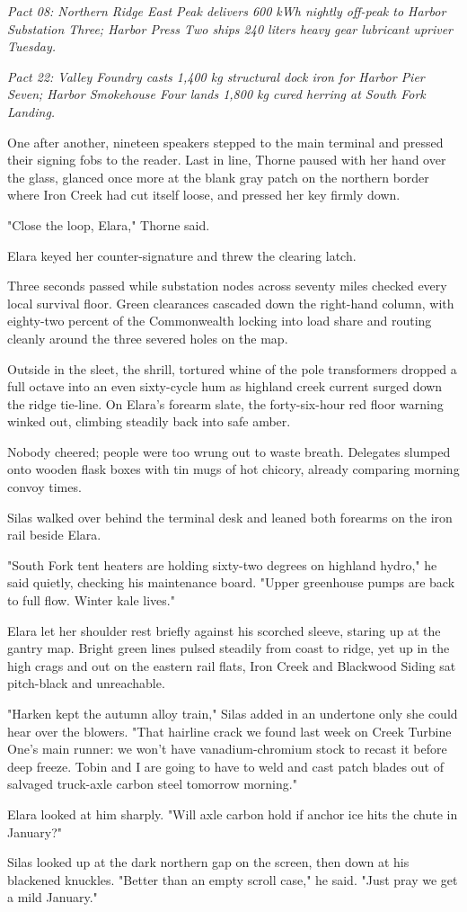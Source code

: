 \textit{Pact 08: Northern Ridge East Peak delivers 600 kWh nightly off-peak to Harbor Substation Three; Harbor Press Two ships 240 liters heavy gear lubricant upriver Tuesday.}

\textit{Pact 22: Valley Foundry casts 1,400 kg structural dock iron for Harbor Pier Seven; Harbor Smokehouse Four lands 1,800 kg cured herring at South Fork Landing.}

One after another, nineteen speakers stepped to the main terminal and pressed their signing fobs to the reader. Last in line, Thorne paused with her hand over the glass, glanced once more at the blank gray patch on the northern border where Iron Creek had cut itself loose, and pressed her key firmly down.

"Close the loop, Elara," Thorne said.

Elara keyed her counter-signature and threw the clearing latch.

Three seconds passed while substation nodes across seventy miles checked every local survival floor. Green clearances cascaded down the right-hand column, with eighty-two percent of the Commonwealth locking into load share and routing cleanly around the three severed holes on the map.

Outside in the sleet, the shrill, tortured whine of the pole transformers dropped a full octave into an even sixty-cycle hum as highland creek current surged down the ridge tie-line. On Elara's forearm slate, the forty-six-hour red floor warning winked out, climbing steadily back into safe amber.

Nobody cheered; people were too wrung out to waste breath. Delegates slumped onto wooden flask boxes with tin mugs of hot chicory, already comparing morning convoy times.

Silas walked over behind the terminal desk and leaned both forearms on the iron rail beside Elara.

"South Fork tent heaters are holding sixty-two degrees on highland hydro," he said quietly, checking his maintenance board. "Upper greenhouse pumps are back to full flow. Winter kale lives."

Elara let her shoulder rest briefly against his scorched sleeve, staring up at the gantry map. Bright green lines pulsed steadily from coast to ridge, yet up in the high crags and out on the eastern rail flats, Iron Creek and Blackwood Siding sat pitch-black and unreachable.

"Harken kept the autumn alloy train," Silas added in an undertone only she could hear over the blowers. "That hairline crack we found last week on Creek Turbine One's main runner: we won't have vanadium-chromium stock to recast it before deep freeze. Tobin and I are going to have to weld and cast patch blades out of salvaged truck-axle carbon steel tomorrow morning."

Elara looked at him sharply. "Will axle carbon hold if anchor ice hits the chute in January?"

Silas looked up at the dark northern gap on the screen, then down at his blackened knuckles. "Better than an empty scroll case," he said. "Just pray we get a mild January."
